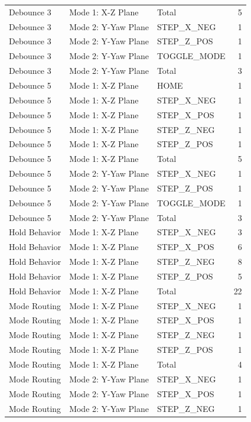 \begin{table}[htbp]
\begin{tabular}{lllr}
Debounce 3 & Mode 1: X-Z Plane & Total & 5 \\
Debounce 3 & Mode 2: Y-Yaw Plane & STEP\_X\_NEG & 1 \\
Debounce 3 & Mode 2: Y-Yaw Plane & STEP\_Z\_POS & 1 \\
Debounce 3 & Mode 2: Y-Yaw Plane & TOGGLE\_MODE & 1 \\
Debounce 3 & Mode 2: Y-Yaw Plane & Total & 3 \\
Debounce 5 & Mode 1: X-Z Plane & HOME & 1 \\
Debounce 5 & Mode 1: X-Z Plane & STEP\_X\_NEG & 1 \\
Debounce 5 & Mode 1: X-Z Plane & STEP\_X\_POS & 1 \\
Debounce 5 & Mode 1: X-Z Plane & STEP\_Z\_NEG & 1 \\
Debounce 5 & Mode 1: X-Z Plane & STEP\_Z\_POS & 1 \\
Debounce 5 & Mode 1: X-Z Plane & Total & 5 \\
Debounce 5 & Mode 2: Y-Yaw Plane & STEP\_X\_NEG & 1 \\
Debounce 5 & Mode 2: Y-Yaw Plane & STEP\_Z\_POS & 1 \\
Debounce 5 & Mode 2: Y-Yaw Plane & TOGGLE\_MODE & 1 \\
Debounce 5 & Mode 2: Y-Yaw Plane & Total & 3 \\
Hold Behavior & Mode 1: X-Z Plane & STEP\_X\_NEG & 3 \\
Hold Behavior & Mode 1: X-Z Plane & STEP\_X\_POS & 6 \\
Hold Behavior & Mode 1: X-Z Plane & STEP\_Z\_NEG & 8 \\
Hold Behavior & Mode 1: X-Z Plane & STEP\_Z\_POS & 5 \\
Hold Behavior & Mode 1: X-Z Plane & Total & 22 \\
Mode Routing & Mode 1: X-Z Plane & STEP\_X\_NEG & 1 \\
Mode Routing & Mode 1: X-Z Plane & STEP\_X\_POS & 1 \\
Mode Routing & Mode 1: X-Z Plane & STEP\_Z\_NEG & 1 \\
Mode Routing & Mode 1: X-Z Plane & STEP\_Z\_POS & 1 \\
Mode Routing & Mode 1: X-Z Plane & Total & 4 \\
Mode Routing & Mode 2: Y-Yaw Plane & STEP\_X\_NEG & 1 \\
Mode Routing & Mode 2: Y-Yaw Plane & STEP\_X\_POS & 1 \\
Mode Routing & Mode 2: Y-Yaw Plane & STEP\_Z\_NEG & 1 \\

\end{tabular}
\end{table}
